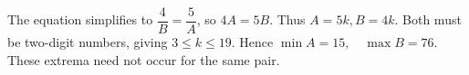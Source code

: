 The equation simplifies to $\dfrac{4}{B}=\dfrac{5}{A}$, so $4A=5B$. Thus $A=5k,B=4k$. Both must be two-digit numbers, giving $3\le k\le19$. Hence $\boxed{\min A=15,\quad\max B=76}$. These extrema need not occur for the same pair.
